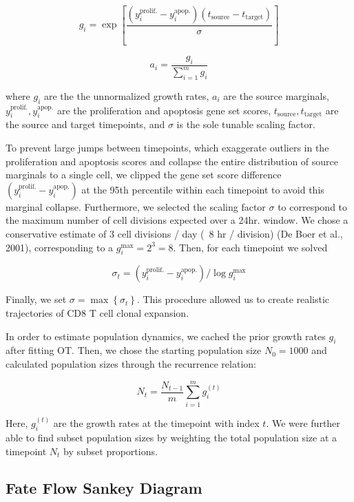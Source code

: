 \[g_{i} = \mathrm{\exp}\left\lbrack \frac{(y_{i}^{\mathrm{\text{prolif.}}} - y_{i}^{\mathrm{\text{apop.}}})(t_{\mathrm{\text{source}}} - t_{\mathrm{\text{target}}})}{\sigma} \right\rbrack\]

\[a_{i} = \frac{g_{i}}{\sum_{i = 1}^{m}g_{i}}\]

where \(g_{i}\) are the the unnormalized growth rates, \(a_{i}\) are the source marginals, \(y_{i}^{\mathrm{\text{prolif.}}},y_{i}^{\mathrm{\text{apop.}}}\) are the proliferation and apoptosis gene set scores, \(t_{\mathrm{\text{source}}},t_{\mathrm{\text{target}}}\) are the source and target timepoints, and \(\sigma\) is the sole tunable scaling factor.

To prevent large jumps between timepoints, which exaggerate outliers in the proliferation and apoptosis scores and collapse the entire distribution of source marginals to a single cell, we clipped the gene set score difference \((y_{i}^{\mathrm{\text{prolif.}}} - y_{i}^{\mathrm{\text{apop.}}})\) at the 95th percentile within each timepoint to avoid this marginal collapse. Furthermore, we selected the scaling factor \(\sigma\) to correspond to the maximum number of cell divisions expected over a 24hr. window. We chose a conservative estimate of 3 cell divisions / day (~8 hr / division) (De Boer et al., 2001), corresponding to a \(g_{i}^{\mathrm{\max}} = 2^{3} = 8\). Then, for each timepoint we solved

\[\sigma_{t} = (y_{i}^{\mathrm{\text{prolif.}}} - y_{i}^{\mathrm{\text{apop.}}})/\mathrm{\log}g_{i}^{\mathrm{\max}}\]

Finally, we set \(\sigma = \mathrm{\max}\left\{ \sigma_{t} \right\}\). This procedure allowed us to create realistic trajectories of CD8 T cell clonal expansion.

In order to estimate population dynamics, we cached the prior growth rates \(g_{i}\) after fitting OT. Then, we chose the starting population size \(N_{0} = 1000\) and calculated population sizes through the recurrence relation:

\[N_{t} = \frac{N_{t - 1}}{m}\sum_{i = 1}^{m}g_{i}^{(t)}\]

Here, \(g_{i}^{(t)}\) are the growth rates at the timepoint with index \(t\). We were further able to find subset population sizes by weighting the total population size at a timepoint \(N_{t}\) by subset proportions.

\subsection{Fate Flow Sankey Diagram}

